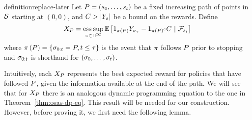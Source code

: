 \begin{restatable}{definition}{replace-later}
    Let 
    \(
        P
        =
        \left(
            s_{0},
            \ldots,
            s_{t}
        \right)
    \)
    be a fixed increasing path of points in $\mathcal{S}$ starting at $(0,0)$, and 
    $C > \left|Y_{s}\right|$ be a bound on the rewards. Define
    \begin{align*}
        X_{P}
        =
        \operatorname*{ess\hspace{0.08cm}sup}_{
            \pi\in\Pi^{\text{IC}}
        }
        \mathbb{E}\left[
            1_{
                \pi\left(P\right)
            }
            Y_{
                \sigma_{\tau}
            }
            -
            1_{
                \pi\left(P\right)^c
            }
            C
            ~
            |
            ~
            \mathcal{F}_{s_{t}}
        \right]
    \end{align*}  
    where 
    \(
        \pi\left(P\right)
        =
        \left\{
            \sigma_{0:t}
            =
            P,
            t\leq \tau
        \right\}
    \)
    is the event that $\pi$ follows $P$ prior to stopping and
    \(
        \sigma_{0:t}
    \) is shorthand for 
    \(
        \left(
            \sigma_{0},\ldots,\sigma_{t} 
        \right)
    \).
\end{restatable}  

Intuitively, each $X_{P}$ represents the best expected reward for policies that have followed $P$, 
given the information available at the end of the path. 
We will see that for $X_{P}$ there is an analogous dynamic programming equation to
the one in
Theorem~\ref{thm:osas-dp-eq}.
This result will be needed for our construction. 
However, before proving it, we first need the following lemma.

